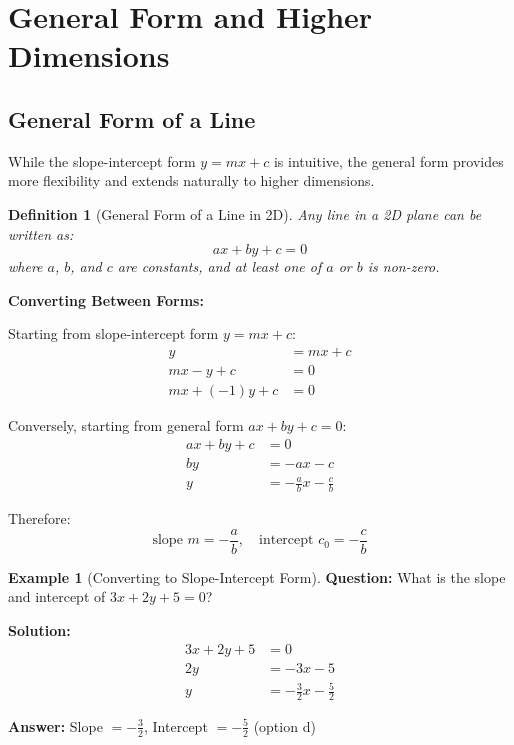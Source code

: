 \documentclass[12pt,a4paper]{article}
\theoremstyle{directpoint}
\newtheorem*{definition}{Definition}
\theoremstyle{definition}
\newtheorem{example}{Example}[section]
\begin{document}
\section{General Form and Higher Dimensions}

\subsection{General Form of a Line}

While the slope-intercept form $y = mx + c$ is intuitive, the general form provides more flexibility and extends naturally to higher dimensions.

\begin{definition}[General Form of a Line in 2D]
Any line in a 2D plane can be written as:
\begin{equation}
ax + by + c = 0
\end{equation}
where $a$, $b$, and $c$ are constants, and at least one of $a$ or $b$ is non-zero.
\end{definition}

\textbf{Converting Between Forms:}

Starting from slope-intercept form $y = mx + c$:
\begin{align}
y &= mx + c \\
mx - y + c &= 0 \\
mx + (-1)y + c &= 0
\end{align}

Conversely, starting from general form $ax + by + c = 0$:
\begin{align}
ax + by + c &= 0 \\
by &= -ax - c \\
y &= -\frac{a}{b}x - \frac{c}{b}
\end{align}

Therefore:
\begin{equation}
\text{slope } m = -\frac{a}{b}, \quad \text{intercept } c_0 = -\frac{c}{b}
\end{equation}

\begin{example}[Converting to Slope-Intercept Form]
\textbf{Question:} What is the slope and intercept of $3x + 2y + 5 = 0$?

\textbf{Solution:}
\begin{align}
3x + 2y + 5 &= 0 \\
2y &= -3x - 5 \\
y &= -\frac{3}{2}x - \frac{5}{2}
\end{align}

\textbf{Answer:} Slope $= -\frac{3}{2}$, Intercept $= -\frac{5}{2}$ (option d)
\end{example}
\end{document}
